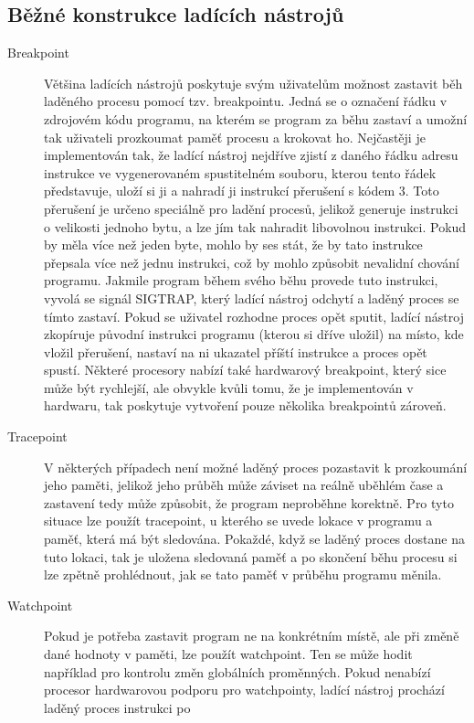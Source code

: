 \documentclass[bc,male,python,dept460]{diploma}						%
\begin{document}
	\subsection{Běžné konstrukce ladících nástrojů}
		\begin{description}
			\item[Breakpoint]
				Většina ladících nástrojů poskytuje svým uživatelům možnost zastavit běh laděného procesu pomocí tzv. breakpointu.
				Jedná se o označení řádku v zdrojovém kódu programu, na kterém se program za běhu zastaví a umožní tak uživateli prozkoumat paměť procesu a krokovat ho.
				Nejčastěji je implementován tak, že ladící nástroj nejdříve zjistí z daného řádku adresu instrukce ve vygenerovaném spustitelném souboru, kterou tento
				řádek představuje, uloží si ji a nahradí ji instrukcí přerušení s kódem 3. Toto přerušení je určeno speciálně pro ladění procesů, jelikož generuje
				instrukci o velikosti jednoho bytu, a lze jím tak nahradit libovolnou instrukci\cite[306]{intel}. Pokud by měla více než jeden byte, mohlo by ses
				stát, že by tato instrukce přepsala více než jednu instrukci, což by mohlo způsobit nevalidní chování programu. Jakmile program během svého běhu
				provede tuto instrukci, vyvolá se signál SIGTRAP, který ladící nástroj odchytí a laděný proces se tímto zastaví. Pokud se uživatel rozhodne proces
				opět sputit, ladící nástroj zkopíruje původní instrukci programu (kterou si dříve uložil) na místo, kde vložil přerušení, nastaví na ni ukazatel
				příští instrukce a proces opět spustí.
				Některé procesory nabízí také hardwarový breakpoint, který sice může být rychlejší, ale obvykle kvůli tomu, že je implementován v hardwaru, tak poskytuje
				vytvoření pouze několika breakpointů zároveň.
			\item[Tracepoint]
				V některých případech není možné laděný proces pozastavit k prozkoumání jeho paměti, jelikož jeho průběh může záviset na reálně uběhlém čase a zastavení
				tedy může způsobit, že program neproběhne korektně. Pro tyto situace lze použít tracepoint, u kterého se uvede lokace v programu a paměť, která má být
				sledována. Pokaždé, když se laděný proces dostane na tuto lokaci, tak je uložena sledovaná paměť a po skončení běhu procesu si lze zpětně prohlédnout,
				jak se tato paměť v průběhu programu měnila.
			\item[Watchpoint]
				Pokud je potřeba zastavit program ne na konkrétním místě, ale při změně dané hodnoty v paměti, lze použít watchpoint. Ten se může hodit například pro
				kontrolu změn globálních proměnných. Pokud nenabízí procesor hardwarovou podporu pro watchpointy, ladící nástroj prochází laděný proces instrukci po

\end{description}
\end{document}
